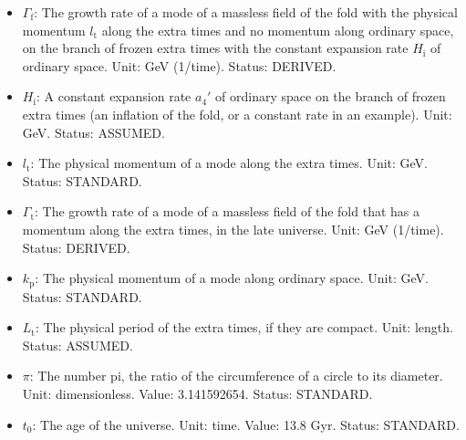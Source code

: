 \documentclass[
  10pt,
]{article}
\providecommand{\tightlist}{%
  \setlength{\itemsep}{0pt}\setlength{\parskip}{0pt}}
\begin{document}
\begin{itemize}
\tightlist
\item
  \(\Gamma_{\mathrm{f}}\): The growth rate of a mode of a massless field
  of the fold with the physical momentum \(l_{\mathrm{t}}\) along the
  extra times and no momentum along ordinary space, on the branch of
  frozen extra times with the constant expansion rate \(H_{\mathrm{i}}\)
  of ordinary space. Unit: GeV (1/time). Status: DERIVED.
\item
  \(H_{\mathrm{i}}\): A constant expansion rate \(a_4'\) of ordinary
  space on the branch of frozen extra times (an inflation of the fold,
  or a constant rate in an example). Unit: GeV. Status: ASSUMED.
\item
  \(l_{\mathrm{t}}\): The physical momentum of a mode along the extra
  times. Unit: GeV. Status: STANDARD.
\item
  \(\Gamma_{\mathrm{t}}\): The growth rate of a mode of a massless field
  of the fold that has a momentum along the extra times, in the late
  universe. Unit: GeV (1/time). Status: DERIVED.
\item
  \(k_{\mathrm{p}}\): The physical momentum of a mode along ordinary
  space. Unit: GeV. Status: STANDARD.
\item
  \(L_{\mathrm{t}}\): The physical period of the extra times, if they
  are compact. Unit: length. Status: ASSUMED.
\item
  \(\pi\): The number pi, the ratio of the circumference of a circle to
  its diameter. Unit: dimensionless. Value: 3.141592654. Status:
  STANDARD.
\item
  \(t_0\): The age of the universe. Unit: time. Value: 13.8 Gyr. Status:
  STANDARD.
\end{itemize}
\end{document}
